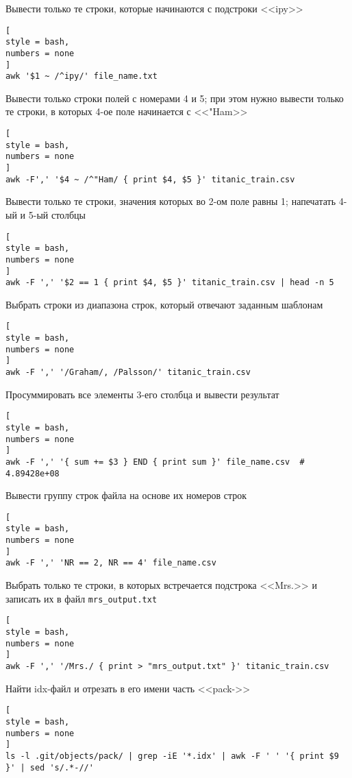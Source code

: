 \documentclass[%
	11pt,
	a4paper,
	utf8,
		]{article}
\begin{document}
Вывести только те строки, которые начинаются с подстроки <<ipy>>
\begin{lstlisting}[
style = bash,
numbers = none
]
awk '$1 ~ /^ipy/' file_name.txt
\end{lstlisting}

Вывести только строки полей с номерами 4 и 5; при этом нужно вывести только те строки, в которых 4-ое поле начинается с <<"Ham>>
\begin{lstlisting}[
style = bash,
numbers = none
]
awk -F',' '$4 ~ /^"Ham/ { print $4, $5 }' titanic_train.csv
\end{lstlisting}

Вывести только те строки, значения которых во 2-ом поле равны 1; напечатать 4-ый и 5-ый столбцы
\begin{lstlisting}[
style = bash,
numbers = none
]
awk -F ',' '$2 == 1 { print $4, $5 }' titanic_train.csv | head -n 5
\end{lstlisting}

Выбрать строки из диапазона строк, который отвечают заданным шаблонам
\begin{lstlisting}[
style = bash,
numbers = none
]
awk -F ',' '/Graham/, /Palsson/' titanic_train.csv
\end{lstlisting}

Просуммировать все элементы 3-его столбца и вывести результат
\begin{lstlisting}[
style = bash,
numbers = none
]
awk -F ',' '{ sum += $3 } END { print sum }' file_name.csv  # 4.89428e+08
\end{lstlisting}

Вывести группу строк файла на основе их номеров строк
\begin{lstlisting}[
style = bash,
numbers = none
]
awk -F ',' 'NR == 2, NR == 4' file_name.csv
\end{lstlisting}

Выбрать только те строки, в которых встречается подстрока <<Mrs.>> и записать их в файл \verb|mrs_output.txt|
\begin{lstlisting}[
style = bash,
numbers = none
]
awk -F ',' '/Mrs./ { print > "mrs_output.txt" }' titanic_train.csv
\end{lstlisting}

Найти idx-файл и отрезать в его имени часть <<pack->>

\begin{lstlisting}[
style = bash,
numbers = none
]
ls -l .git/objects/pack/ | grep -iE '*.idx' | awk -F ' ' '{ print $9 }' | sed 's/.*-//'
\end{lstlisting}
\end{document}
